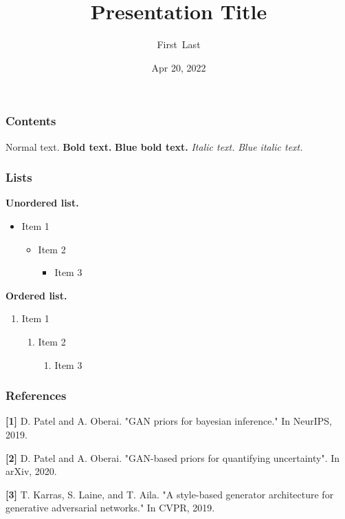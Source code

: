 \documentclass[10pt,aspectratio=169]{beamer}
\title{Presentation Title}
\author[First Last]{First~Last}
\date{Apr 20, 2022}
\newcommand{\textitb}[1]{\textit{\textcolor{jhu-dark}{#1}}}
\newcommand{\textbfb}[1]{\textbf{\textcolor{jhu-dark}{#1}}}
\begin{document}
\setlength{\abovedisplayskip}{1pt}
\setlength{\belowdisplayskip}{1pt}
\setlength{\abovedisplayshortskip}{1pt}
\setlength{\belowdisplayshortskip}{1pt}

{
\begin{frame}[plain,t]
\titlepage
\end{frame}
}

\begin{frame}[t]
\frametitle{Contents}
Normal text. \textbf{Bold text.} \textbfb{Blue bold text.} \textit{Italic text.} \textitb{Blue italic text.}
\end{frame}

\begin{frame}[t]
\frametitle{Lists}
\textbf{Unordered list.}
\begin{itemize}
    \item Item 1
        \begin{itemize}
            \item Item 2
                \begin{itemize}
                    \item Item 3
                \end{itemize}
        \end{itemize}
\end{itemize}
\textbf{Ordered list.}
\begin{enumerate}
    \item Item 1
        \begin{enumerate}
            \item Item 2
                \begin{enumerate}
                    \item Item 3
                \end{enumerate}
        \end{enumerate}
\end{enumerate}
\end{frame}

\begin{frame}[t]
\frametitle{References}
\textbf{[1]} D. Patel and A. Oberai. "GAN priors for bayesian inference." In NeurIPS, 2019.

\textbf{[2]} D. Patel and A. Oberai. "GAN-based priors for quantifying uncertainty". In arXiv, 2020.

\textbf{[3]} T. Karras, S. Laine, and T. Aila. "A style-based generator architecture for generative adversarial networks." In CVPR, 2019.
\end{frame}

{
\begin{frame}[plain,t]
\end{frame}
}
\end{document}
